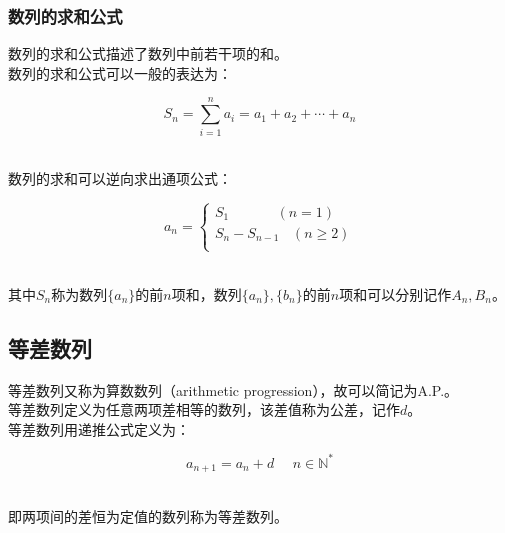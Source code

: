 \documentclass[UTF8]{ctexart}
\begin{document}
\subsubsection{数列的求和公式}
    数列的求和公式描述了数列中前若干项的和。\\[3mm]
    数列的求和公式可以一般的表达为：
    \begin{large}
        \begin{equation*}
            S_n=\sum_{i=1}^{n}a_i=a_1+a_2+\cdots+a_n
        \end{equation*}
    \end{large}\\
    数列的求和可以逆向求出通项公式：
    \begin{large}
        \begin{equation*}
            a_n=
            \begin{cases}
                S_1\hspace{30pt}~~~~(n=1)\\[1mm]
                S_n-S_{n-1}~~~~(n\geq 2)\\[1mm]
            \end{cases}
        \end{equation*}
    \end{large}\\
    其中$S_n$称为数列$\{a_n\}$的前$n$项和，数列$\{a_n\},\{b_n\}$的前$n$项和可以分别记作$A_n,B_n$。

\newpage

\subsection{等差数列}
    等差数列又称为算数数列（arithmetic progression），故可以简记为A.P.。\\[3mm]
    等差数列定义为任意两项差相等的数列，该差值称为公差，记作$d$。\\[3mm]
    等差数列用递推公式定义为：
    \begin{large}
        \begin{equation*}
            a_{n+1}=a_n+d~~~~~~n\in\mathbb{N^*}
        \end{equation*}
    \end{large}\\
    即两项间的差恒为定值的数列称为等差数列。
\end{document}
